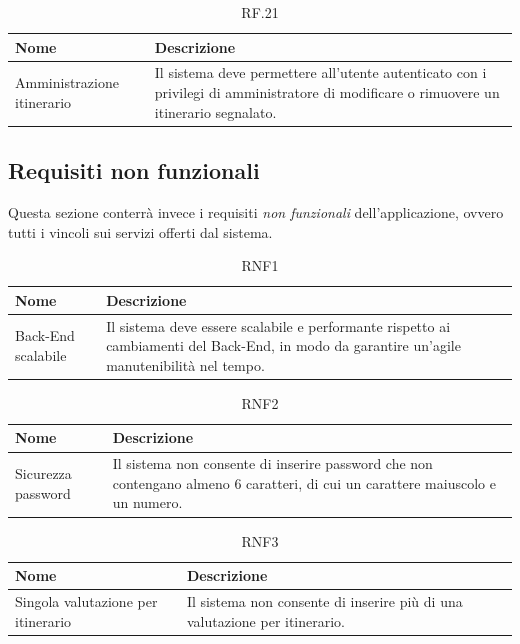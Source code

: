 \documentclass{natourDoc}
\begin{document}
	\begin{table}[H]
		\centering
		\begin{tabular}{ |p{5cm}|p{10.3cm}| }
			\hline
			\rowcolor{PineGreen!70}
			\textbf{Nome} & \textbf{Descrizione} \\
			\hline
			Amministrazione itinerario & Il sistema deve permettere all'utente autenticato con i privilegi di amministratore di modificare o
			rimuovere un itinerario segnalato.\\
			\hline
		\end{tabular}
		\caption{RF.21}
		\label{table:21}
	\end{table}

	\subsection{Requisiti non funzionali}
	Questa sezione conterrà invece i requisiti \textit{non funzionali} dell'applicazione, ovvero tutti i vincoli sui servizi offerti dal sistema.

	\begin{table}[H]
		\centering
		\begin{tabular}{ |p{5cm}|p{10.3cm}| } 
			\hline
			\rowcolor{PineGreen!70}
			\textbf{Nome} & \textbf{Descrizione} \\
			\hline
			Back-End scalabile & Il sistema deve essere scalabile e performante rispetto ai cambiamenti del Back-End,
			in modo da garantire un'agile manutenibilità nel tempo. \\
			\hline
		\end{tabular}
		\caption{RNF1}
		\label{table:21}
	\end{table}
	
	\begin{table}[H]
		\centering
		\begin{tabular}{ |p{5cm}|p{10.3cm}| } 
			\hline
			\rowcolor{PineGreen!70}
			\textbf{Nome} & \textbf{Descrizione} \\
			\hline
			Sicurezza password & Il sistema non consente di inserire password che non contengano 
			almeno 6 caratteri, di cui un carattere maiuscolo e un numero.\\
			\hline
		\end{tabular}
		\caption{RNF2}
		\label{table:22}
	\end{table}


	\begin{table}[H]
		\centering
		\begin{tabular}{ |p{5cm}|p{10.3cm}| } 
			\hline
			\rowcolor{PineGreen!70}
			\textbf{Nome} & \textbf{Descrizione} \\
			\hline
			Singola valutazione per itinerario & Il sistema non consente di inserire più di una valutazione
			per itinerario. \\
			\hline
		\end{tabular}
		\caption{RNF3}
		\label{table:23}
	\end{table}
\end{document}
